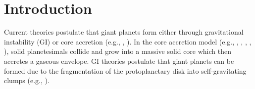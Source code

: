\documentclass[apj, numberedappendix]{emulateapj}
\begin{document}
%



\section{Introduction}
\label{intro}

Current theories postulate that giant planets form either through gravitational instability (GI) or core accretion (e.g., \citealt{dangelo11}, \citealt{youdin13}). In the core accretion model (e.g., \citealt{harris78}, \citealt{mizuno78}, \citealt{stevenson82}, \citealt{boden86}, \citealt{pollack96}), solid planetesimals collide and grow into a massive solid core which then accretes a gaseous envelope. GI theories postulate that giant planets can be formed due to the fragmentation of the protoplanetary disk into self-gravitating clumps (e.g., \citealt{boss97}).  %

\end{document}
